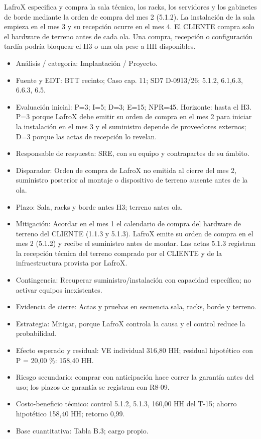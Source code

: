 LafroX especifica y compra la sala técnica, los racks, los servidores y los gabinetes de borde mediante la orden de compra del mes 2 (5.1.2). La instalación de la sala empieza en el mes 3 y su recepción ocurre en el mes 4. El CLIENTE compra solo el hardware de terreno antes de cada ola. Una compra, recepción o configuración tardía podría bloquear el H3 o una ola pese a HH disponibles.

\begin{itemize}[leftmargin=*,itemsep=3pt]
\item Análisis / categoría: Implantación / Proyecto.
\item Fuente y EDT: BTT recinto; Caso cap. 11; SD7 D-09\textendash{}13/26; 5.1.2, 6.1,6.3, 6.6.3, 6.5.
\item Evaluación inicial: P=3; I=5; D=3; E=15; NPR=45. Horizonte: hasta el H3. P=3 porque LafroX debe emitir su orden de compra en el mes 2 para iniciar la instalación en el mes 3 y el suministro depende de proveedores externos; D=3 porque las actas de recepción lo revelan.
\item Responsable de respuesta: SRE, con su equipo y contrapartes de su ámbito.
\item Disparador: Orden de compra de LafroX no emitida al cierre del mes 2, suministro posterior al montaje o dispositivo de terreno ausente antes de la ola.
\item Plazo: Sala, racks y borde antes H3; terreno antes ola.
\item Mitigación: Acordar en el mes 1 el calendario de compra del hardware de terreno del CLIENTE (1.1.3 y 5.1.3). LafroX emite su orden de compra en el mes 2 (5.1.2) y recibe el suministro antes de montar. Las actas 5.1.3 registran la recepción técnica del terreno comprado por el CLIENTE y de la infraestructura provista por LafroX.
\item Contingencia: Recuperar suministro/instalación con capacidad específica; no activar equipos inexistentes.
\item Evidencia de cierre: Actas y pruebas en secuencia sala, racks, borde y terreno.
\item Estrategia: Mitigar, porque LafroX controla la causa y el control reduce la probabilidad.
\item Efecto esperado y residual: VE individual 316,80 HH; residual hipotético con P = 20,00 \%: 158,40 HH.
\item Riesgo secundario: comprar con anticipación hace correr la garantía antes del uso; los plazos de garantía se registran con R8-09.
\item Costo-beneficio técnico: control 5.1.2, 5.1.3, 160,00 HH del T-15; ahorro hipotético 158,40 HH; retorno 0,99.
\item Base cuantitativa: Tabla B.3; cargo propio.
\end{itemize}

